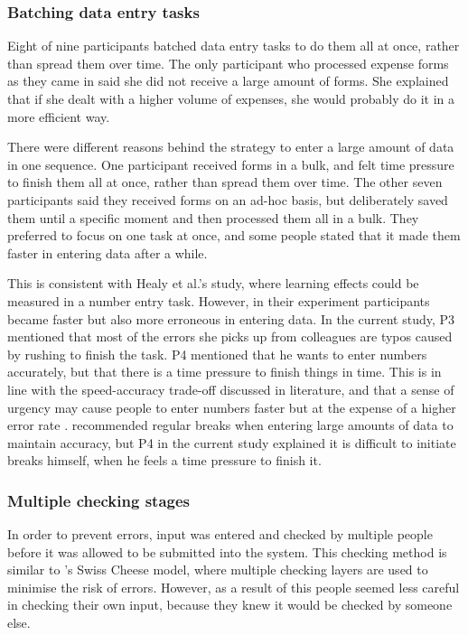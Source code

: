 \documentclass[11pt,oneside]{report}
\begin{document}
\subsubsection{Batching data entry tasks}
Eight of nine participants batched data entry tasks to do them all at once, rather than spread them over time. The only participant who processed expense forms as they came in said she did not receive a large amount of forms. She explained that if she dealt with a higher volume of expenses, she would probably do it in a more efficient way.

There were different reasons behind the strategy to enter a large amount of data in one sequence. One participant received forms in a bulk, and felt time pressure to finish them all at once, rather than spread them over time. The other seven participants said they received forms on an ad-hoc basis, but deliberately saved them until a specific moment and then processed them all in a bulk. They preferred to focus on one task at once, and some people stated that it made them faster in entering data after a while. 

This is consistent with Healy et al.'s \citeyearpar{Healy2004} study, where learning effects could be measured in a number entry task. However, in their experiment participants became faster but also more erroneous in entering data. In the current study, P3 mentioned that most of the errors she picks up from colleagues are typos caused by rushing to finish the task. P4 mentioned that he wants to enter numbers accurately, but that there is a time pressure to finish things in time. This is in line with the speed-accuracy trade-off discussed in literature, and that a sense of urgency may cause people to enter numbers faster but at the expense of a higher error rate \citep{Lin2011, Lin2013}.
\citet{Healy2004} recommended regular breaks when entering large amounts of data to maintain accuracy, but P4 in the current study explained it is difficult to initiate breaks himself, when he feels a time pressure to finish it.

\subsubsection{Multiple checking stages}
In order to prevent errors, input was entered and checked by multiple people before it was allowed to be submitted into the system. This checking method is similar to \citeauthor{Reason1990}'s \citeyearpar{Reason1990}  Swiss Cheese model, where multiple checking layers are used to minimise the risk of errors. However, as a result of this people seemed less careful in checking their own input, because they knew it would be checked by someone else. 
\end{document}
